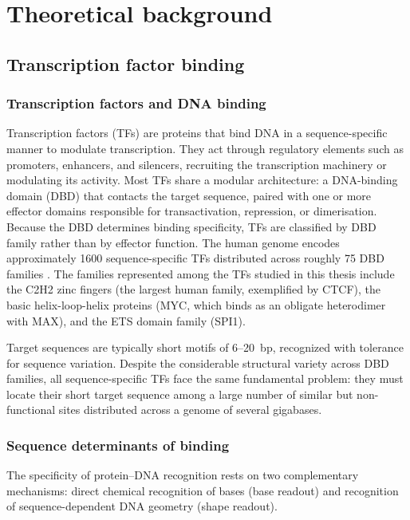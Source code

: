 \chapter{Theoretical background}

\shorthandoff{-} 

\section{Transcription factor binding}
\label{sec:tf-binding}

\subsection{Transcription factors and DNA binding}

Transcription factors (TFs) are proteins that bind DNA in a sequence-specific manner to modulate transcription.
They act through regulatory elements such as promoters, enhancers, and silencers, recruiting the transcription machinery or modulating its activity.
Most TFs share a modular architecture: a DNA-binding domain (DBD) that contacts the target sequence, paired with one or more effector domains responsible for transactivation, repression, or dimerisation.
Because the DBD determines binding specificity, TFs are classified by DBD family rather than by effector function.
The human genome encodes approximately 1600 sequence-specific TFs distributed across roughly 75 DBD families \cite{lambertHumanTranscriptionFactors2018}.
The families represented among the TFs studied in this thesis include the C2H2 zinc fingers (the largest human family, exemplified by CTCF), the basic helix-loop-helix proteins (MYC, which binds as an obligate heterodimer with MAX), and the ETS domain family (SPI1).

Target sequences are typically short motifs of 6--20~bp, recognized with tolerance for sequence variation.
Despite the considerable structural variety across DBD families, all sequence-specific TFs face the same fundamental problem:
they must locate their short target sequence among a large number of similar but non-functional sites distributed across a genome of several gigabases.

\subsection{Sequence determinants of binding}
\label{sec:readout}

The specificity of protein--DNA recognition rests on two complementary mechanisms: direct chemical recognition of bases (base readout) and recognition of sequence-dependent DNA geometry (shape readout).

